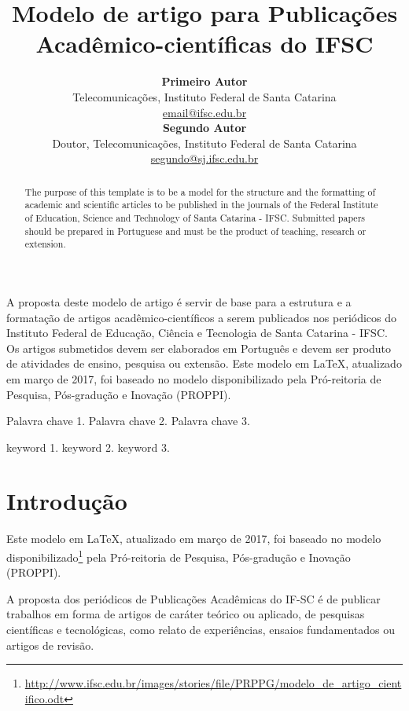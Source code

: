\documentclass[12pt]{article}
\title{\textbf{Modelo de artigo para Publicações Acadêmico-científicas do IFSC}}
\author{\textbf{Primeiro Autor}\\
Telecomunicações, Instituto Federal de Santa Catarina\\
\url{email@ifsc.edu.br}
\vspace*{.2cm}\\
\textbf{Segundo Autor}\\
Doutor, Telecomunicações, Instituto Federal de Santa Catarina\\
\url{segundo@sj.ifsc.edu.br}
}
\date{}
\begin{document}
\captionsetup{font=small,labelfont=bf,textfont=bf}



\maketitle

\begin{resumo}
A proposta deste modelo de artigo é servir de base para a estrutura e a formatação de artigos acadêmico-científicos a serem publicados nos periódicos do Instituto Federal de Educação, Ciência e Tecnologia de Santa Catarina - IFSC. Os artigos submetidos devem ser elaborados em Português e devem ser produto de atividades de ensino, pesquisa ou extensão. Este modelo em \LaTeX, atualizado em março de 2017, foi baseado no modelo disponibilizado pela Pró-reitoria de Pesquisa, Pós-gradução e Inovação (PROPPI).
\end{resumo}

 \begin{palavraschave}
 Palavra chave 1. Palavra chave 2. Palavra chave 3.
 \end{palavraschave}

\begin{abstract}
The purpose of this template is to be a model for the structure and the formatting of academic and scientific articles to be published in the journals of the Federal Institute of Education, Science and Technology of Santa Catarina - IFSC. Submitted papers should be prepared in Portuguese and must be the product of teaching, research or extension.
\end{abstract}

 \begin{keywords}
 keyword 1. keyword 2. keyword 3.
 \end{keywords}


\thispagestyle{empty}

\section{Introdução}
\label{s_introducao}

Este modelo em \LaTeX, atualizado em março de 2017, foi baseado no modelo disponibilizado\footnote{\url{http://www.ifsc.edu.br/images/stories/file/PRPPG/modelo_de_artigo_cientifico.odt}} pela Pró-reitoria de Pesquisa, Pós-gradução e Inovação (PROPPI).

A proposta dos periódicos de Publicações Acadêmicas do IF-SC é de publicar trabalhos em forma de artigos de caráter teórico ou aplicado, de pesquisas científicas e tecnológicas, como relato de experiências, ensaios fundamentados ou artigos de revisão.
\end{document}
